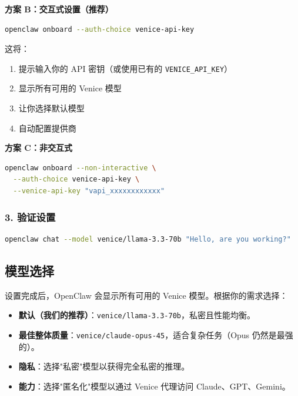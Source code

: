 \textbf{方案 B：交互式设置（推荐）}

\begin{lstlisting}[language=bash]
openclaw onboard --auth-choice venice-api-key
\end{lstlisting}


这将：

\begin{enumerate}
  \item 提示输入你的 API 密钥（或使用已有的 \texttt{VENICE\_API\_KEY}）
  \item 显示所有可用的 Venice 模型
  \item 让你选择默认模型
  \item 自动配置提供商
\end{enumerate}


\textbf{方案 C：非交互式}

\begin{lstlisting}[language=bash]
openclaw onboard --non-interactive \
  --auth-choice venice-api-key \
  --venice-api-key "vapi_xxxxxxxxxxxx"
\end{lstlisting}


\subsubsection{3. 验证设置}


\begin{lstlisting}[language=bash]
openclaw chat --model venice/llama-3.3-70b "Hello, are you working?"
\end{lstlisting}


\subsection{模型选择}


设置完成后，OpenClaw 会显示所有可用的 Venice 模型。根据你的需求选择：

\begin{itemize}
  \item \textbf{默认（我们的推荐）}：\texttt{venice/llama-3.3-70b}，私密且性能均衡。
  \item \textbf{最佳整体质量}：\texttt{venice/claude-opus-45}，适合复杂任务（Opus 仍然是最强的）。
  \item \textbf{隐私}：选择"私密"模型以获得完全私密的推理。
  \item \textbf{能力}：选择"匿名化"模型以通过 Venice 代理访问 Claude、GPT、Gemini。
\end{itemize}


